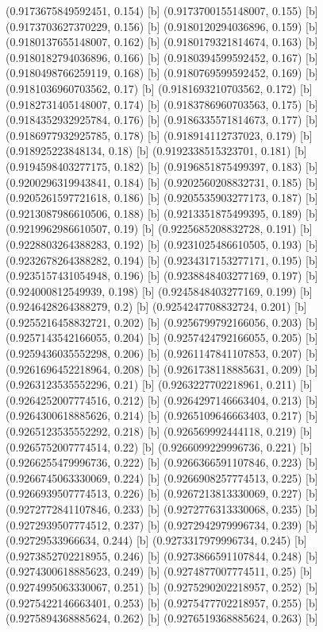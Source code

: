 {{{(0.9173675849592451, 0.154) [b] 
(0.9173700155148007, 0.155) [b] 
(0.9173703627370229, 0.156) [b] 
(0.9180120294036896, 0.159) [b] 
(0.9180137655148007, 0.162) [b] 
(0.9180179321814674, 0.163) [b] 
(0.9180182794036896, 0.166) [b] 
(0.9180394599592452, 0.167) [b] 
(0.9180498766259119, 0.168) [b] 
(0.9180769599592452, 0.169) [b] 
(0.9181036960703562, 0.17) [b] 
(0.9181693210703562, 0.172) [b] 
(0.9182731405148007, 0.174) [b] 
(0.9183786960703563, 0.175) [b] 
(0.9184352932925784, 0.176) [b] 
(0.9186335571814673, 0.177) [b] 
(0.9186977932925785, 0.178) [b] 
(0.918914112737023, 0.179) [b] 
(0.918925223848134, 0.18) [b] 
(0.9192338515323701, 0.181) [b] 
(0.9194598403277175, 0.182) [b] 
(0.9196851875499397, 0.183) [b] 
(0.9200296319943841, 0.184) [b] 
(0.9202560208832731, 0.185) [b] 
(0.9205261597721618, 0.186) [b] 
(0.9205535903277173, 0.187) [b] 
(0.9213087986610506, 0.188) [b] 
(0.9213351875499395, 0.189) [b] 
(0.9219962986610507, 0.19) [b] 
(0.9225685208832728, 0.191) [b] 
(0.9228803264388283, 0.192) [b] 
(0.9231025486610505, 0.193) [b] 
(0.9232678264388282, 0.194) [b] 
(0.9234317153277171, 0.195) [b] 
(0.9235157431054948, 0.196) [b] 
(0.9238848403277169, 0.197) [b] 
(0.924000812549939, 0.198) [b] 
(0.9245848403277169, 0.199) [b] 
(0.9246428264388279, 0.2) [b] 
(0.9254247708832724, 0.201) [b] 
(0.9255216458832721, 0.202) [b] 
(0.9256799792166056, 0.203) [b] 
(0.9257143542166055, 0.204) [b] 
(0.9257424792166055, 0.205) [b] 
(0.9259436035552298, 0.206) [b] 
(0.9261147841107853, 0.207) [b] 
(0.9261696452218964, 0.208) [b] 
(0.9261738118885631, 0.209) [b] 
(0.9263123535552296, 0.21) [b] 
(0.9263227702218961, 0.211) [b] 
(0.9264252007774516, 0.212) [b] 
(0.9264297146663404, 0.213) [b] 
(0.9264300618885626, 0.214) [b] 
(0.9265109646663403, 0.217) [b] 
(0.9265123535552292, 0.218) [b] 
(0.926569992444118, 0.219) [b] 
(0.9265752007774514, 0.22) [b] 
(0.9266099229996736, 0.221) [b] 
(0.9266255479996736, 0.222) [b] 
(0.9266366591107846, 0.223) [b] 
(0.9266745063330069, 0.224) [b] 
(0.9266908257774513, 0.225) [b] 
(0.9266939507774513, 0.226) [b] 
(0.9267213813330069, 0.227) [b] 
(0.9272772841107846, 0.233) [b] 
(0.9272776313330068, 0.235) [b] 
(0.9272939507774512, 0.237) [b] 
(0.9272942979996734, 0.239) [b] 
(0.92729533966634, 0.244) [b] 
(0.9273317979996734, 0.245) [b] 
(0.9273852702218955, 0.246) [b] 
(0.9273866591107844, 0.248) [b] 
(0.9274300618885623, 0.249) [b] 
(0.9274877007774511, 0.25) [b] 
(0.9274995063330067, 0.251) [b] 
(0.9275290202218957, 0.252) [b] 
(0.9275422146663401, 0.253) [b] 
(0.9275477702218957, 0.255) [b] 
(0.9275894368885624, 0.262) [b] 
(0.9276519368885624, 0.263) [b] 
}}}
